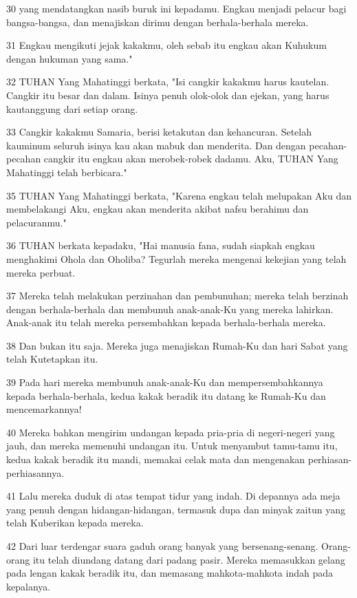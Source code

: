 \par 30 yang mendatangkan nasib buruk ini kepadamu. Engkau menjadi pelacur bagi bangsa-bangsa, dan menajiskan dirimu dengan berhala-berhala mereka.
\par 31 Engkau mengikuti jejak kakakmu, oleh sebab itu engkau akan Kuhukum dengan hukuman yang sama."
\par 32 TUHAN Yang Mahatinggi berkata, "Isi cangkir kakakmu harus kautelan. Cangkir itu besar dan dalam. Isinya penuh olok-olok dan ejekan, yang harus kautanggung dari setiap orang.
\par 33 Cangkir kakakmu Samaria, berisi ketakutan dan kehancuran. Setelah kauminum seluruh isinya kau akan mabuk dan menderita. Dan dengan pecahan-pecahan cangkir itu engkau akan merobek-robek dadamu. Aku, TUHAN Yang Mahatinggi telah berbicara."
\par 35 TUHAN Yang Mahatinggi berkata, "Karena engkau telah melupakan Aku dan membelakangi Aku, engkau akan menderita akibat nafsu berahimu dan pelacuranmu."
\par 36 TUHAN berkata kepadaku, "Hai manusia fana, sudah siapkah engkau menghakimi Ohola dan Oholiba? Tegurlah mereka mengenai kekejian yang telah mereka perbuat.
\par 37 Mereka telah melakukan perzinahan dan pembunuhan; mereka telah berzinah dengan berhala-berhala dan membunuh anak-anak-Ku yang mereka lahirkan. Anak-anak itu telah mereka persembahkan kepada berhala-berhala mereka.
\par 38 Dan bukan itu saja. Mereka juga menajiskan Rumah-Ku dan hari Sabat yang telah Kutetapkan itu.
\par 39 Pada hari mereka membunuh anak-anak-Ku dan mempersembahkannya kepada berhala-berhala, kedua kakak beradik itu datang ke Rumah-Ku dan mencemarkannya!
\par 40 Mereka bahkan mengirim undangan kepada pria-pria di negeri-negeri yang jauh, dan mereka memenuhi undangan itu. Untuk menyambut tamu-tamu itu, kedua kakak beradik itu mandi, memakai celak mata dan mengenakan perhiasan-perhiasannya.
\par 41 Lalu mereka duduk di atas tempat tidur yang indah. Di depannya ada meja yang penuh dengan hidangan-hidangan, termasuk dupa dan minyak zaitun yang telah Kuberikan kepada mereka.
\par 42 Dari luar terdengar suara gaduh orang banyak yang bersenang-senang. Orang-orang itu telah diundang datang dari padang pasir. Mereka memasukkan gelang pada lengan kakak beradik itu, dan memasang mahkota-mahkota indah pada kepalanya.
